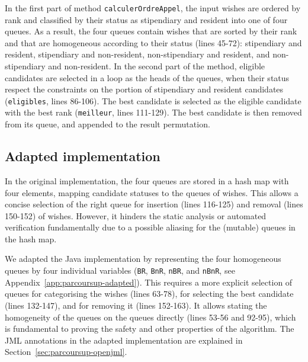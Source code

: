 \documentclass[a4paper]{report}
\newcommand{\cref}[1]{Section~\ref{#1}}
\newcommand{\aref}[1]{Appendix~\ref{#1}}
\begin{document}
In the first part of method \texttt{calculerOrdreAppel}, the input wishes are
ordered by rank and classified by their status as stipendiary and resident into
one of four queues. As a result, the four queues contain wishes that are sorted
by their rank and that are homogeneous according to their status (lines 45-72):
stipendiary and resident, stipendiary and non-resident, non-stipendiary and
resident, and non-stipendiary and non-resident. In the second part of the
method, eligible candidates are selected in a loop as the heads of the queues,
when their status respect the constraints on the portion of stipendiary and
resident candidates (\texttt{eligibles}, lines 86-106). The best candidate is
selected as the eligible candidate with the best rank (\texttt{meilleur}, lines
111-129). The best candidate is then removed from its queue, and appended to the
result permutation.

\subsection{Adapted implementation}
\label{sec:parcoursup-adapted}

In the original implementation, the four queues are stored in a hash map with
four elements, mapping candidate statuses to the queues of wishes. This allows a
concise selection of the right queue for insertion (lines 116-125) and removal
(lines 150-152) of wishes. However, it hinders the static analysis or automated
verification fundamentally due to a possible aliasing for the (mutable) queues
in the hash map.

We adapted the Java implementation by representing the four homogeneous queues
by four individual variables (\texttt{BR}, \texttt{BnR}, \texttt{nBR}, and
\texttt{nBnR}, see \aref{app:parcoursup-adapted}). This requires a more explicit
selection of queues for categorising the wishes (lines 63-78), for selecting the
best candidate (lines 132-147), and for removing it (lines 152-163). It allows
stating the homogeneity of the queues on the queues directly (lines 53-56 and
92-95), which is fundamental to proving the safety and other properties of the
algorithm. %
The JML annotations in the adapted implementation are explained in
\cref{sec:parcoursup-openjml}.
\end{document}
